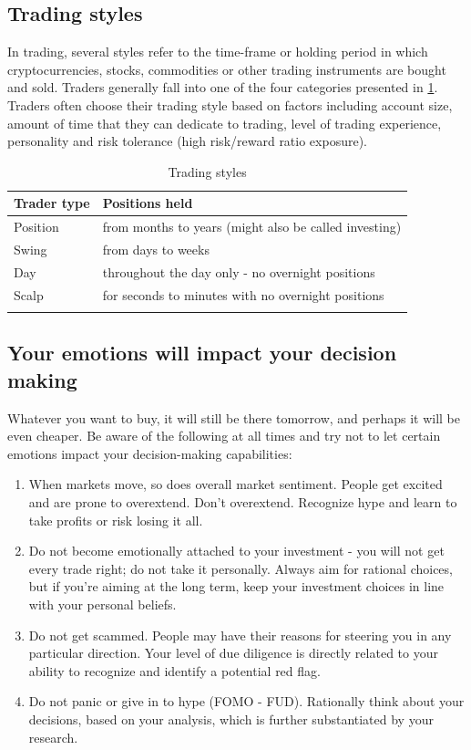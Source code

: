 \subsection{Trading styles}
In trading, several styles refer to the time-frame or holding period in which cryptocurrencies, stocks, commodities or other trading instruments are bought and sold. Traders generally fall into one of the four categories presented in \cref{tab:tradertypes}. Traders often choose their trading style based on factors including account size, amount of time that they can dedicate to trading, level of trading experience, personality and risk tolerance (high risk/reward ratio exposure).

\begin{table}[!htb]
\centering
\caption{Trading styles}
\begin{tabular}{ll}
\toprule
\textbf{Trader type}         &   \textbf{Positions held}                 \\
\midrule
                   
Position          &    from months to years (might also be called investing)                 \\
Swing             &    from days to weeks                    \\
Day               &    throughout the day only - no overnight positions\\
Scalp             &    for seconds to minutes with no overnight positions \\
\bottomrule                                     
\label{tab:tradertypes}
\end{tabular}
\end{table}

\subsection{Your emotions will impact your decision making}
Whatever you want to buy, it will still be there tomorrow, and perhaps it will be even cheaper. Be aware of the following at all times and try not to let certain emotions impact your decision-making capabilities:

\begin{enumerate}
    \item When markets move, so does overall market sentiment. People get excited and are prone to overextend. Don't overextend. Recognize hype and learn to take profits or risk losing it all.
    \item Do not become emotionally attached to your investment - you will not get every trade right; do not take it personally. Always aim for rational choices, but if you're aiming at the long term, keep your investment choices in line with your personal beliefs.
    \item Do not get scammed. People may have their reasons for steering you in any particular direction. Your level of due diligence is directly related to your ability to recognize and identify a potential red flag.
    \item Do not panic or give in to hype (FOMO - FUD). Rationally think about your decisions, based on your analysis, which is further substantiated by your research.
\end{enumerate}

